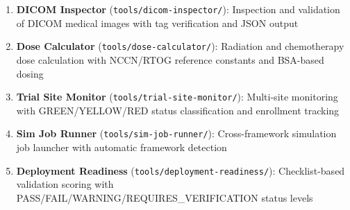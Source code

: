 \begin{enumerate}
  \item \textbf{DICOM Inspector} (\texttt{tools/dicom-inspector/}): Inspection and validation of DICOM medical images with tag verification and JSON output
  \item \textbf{Dose Calculator} (\texttt{tools/dose-calculator/}): Radiation and chemotherapy dose calculation with NCCN/RTOG reference constants and BSA-based dosing
  \item \textbf{Trial Site Monitor} (\texttt{tools/trial-site-monitor/}): Multi-site monitoring with GREEN/YELLOW/RED status classification and enrollment tracking
  \item \textbf{Sim Job Runner} (\texttt{tools/sim-job-runner/}): Cross-framework simulation job launcher with automatic framework detection
  \item \textbf{Deployment Readiness} (\texttt{tools/deployment-readiness/}): Checklist-based validation scoring with PASS/FAIL/WARNING/REQUIRES\_VERIFICATION status levels
\end{enumerate}

